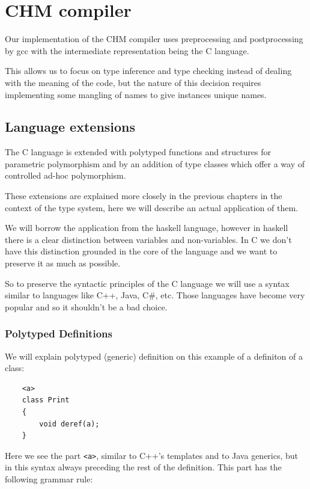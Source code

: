 \chapter{CHM compiler}

Our implementation of the CHM compiler uses preprocessing and postprocessing by gcc with the intermediate representation being the C language.

This allows us to focus on type inference and type checking instead of dealing with the meaning of the code, but the nature of this decision requires implementing some mangling of names to give instances unique names.

\section{Language extensions}

The C language is extended with polytyped functions and structures for parametric polymorphism and by an addition of type classes which offer a way of controlled ad-hoc polymorphism.

These extensions are explained more closely in the previous chapters in the context of the type system, here we will describe an actual application of them.

We will borrow the application from the haskell language, however in haskell there is a clear distinction between variables and non-variables. In C we don't have this distinction grounded in the core of the language and we want to preserve it as much as possible.

So to preserve the syntactic principles of the C language we will use a syntax similar to languages like C++, Java, C\#, etc. Those languages have become very popular and so it shouldn't be a bad choice. %

\subsection{Polytyped Definitions}

We will explain polytyped (generic) definition on this example of a definiton of a class:

\begin{lstlisting}
    <a>
    class Print
    {
        void deref(a);
    }
\end{lstlisting}

Here we see the part \lstinline{<a>}, similar to C++'s templates and to Java generics, but in this syntax always preceding the rest of the definition. This part has the following grammar rule: %

